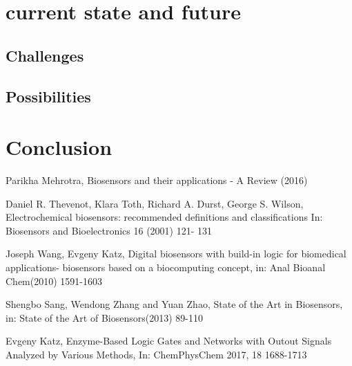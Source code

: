 \documentclass[runningheads]{llncs}
\begin{document}
\section{current state and future}
\subsection{Challenges}
\subsection{Possibilities}

\section{Conclusion}



\begin{thebibliography}{8}
	Parikha Mehrotra, Biosensors and their applications - A Review (2016)
	
	Daniel R. Thevenot, Klara Toth, Richard A. Durst, George S. Wilson, Electrochemical biosensors: recommended definitions and classifications In: Biosensors and Bioelectronics 16 (2001) 121- 131
	
	Joseph Wang, Evgeny Katz, Digital biosensors with build-in logic for biomedical applications- biosensors based on a biocomputing concept, in: Anal Bioanal Chem(2010) 1591-1603
	
	Shengbo Sang, Wendong Zhang and Yuan Zhao, State of the Art in Biosensors, in: State of the Art of Biosensors(2013) 89-110
	
	Evgeny Katz, Enzyme-Based Logic Gates and Networks with Outout Signals Analyzed by Various Methods, In: ChemPhysChem 2017, 18 1688-1713
	
\end{thebibliography}
\end{document}

